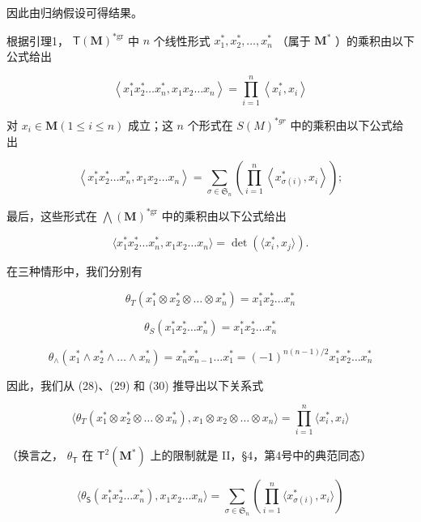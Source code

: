 因此由归纳假设可得结果。

根据引理1， \(\mathsf{T}(\mathbf{M})^{*\mathrm{gr}}\) 中 \(n\) 个线性形式 \(x_{1}^{*}, x_{2}^{*}, \ldots, x_{n}^{*}\) （属于 \(\mathbf{M}^{*}\) ）的乘积由以下公式给出

\[
\left\langle x _ {1} ^ {*} x _ {2} ^ {*} \dots x _ {n} ^ {*}, x _ {1} x _ {2} \dots x _ {n} \right\rangle = \prod_ {i = 1} ^ {n} \left\langle x _ {i} ^ {*}, x _ {i} \right\rangle\tag{28}
\]

对 \(x_{i} \in \mathbf{M} (1 \leqslant i \leqslant n)\) 成立；这 \(n\) 个形式在 \(S(M)^{*gr}\) 中的乘积由以下公式给出

\[
\left\langle x _ {1} ^ {*} x _ {2} ^ {*} \dots x _ {n} ^ {*}, x _ {1} x _ {2} \dots x _ {n} \right\rangle = \sum_ {\sigma \in \mathfrak {S} _ {n}} \left(\prod_ {i = 1} ^ {n} \left\langle x _ {\sigma (i)} ^ {*}, x _ {i} \right\rangle\right);\tag{29}
\]

最后，这些形式在 \(\bigwedge (\mathbf{M})^{*\mathrm{gr}}\) 中的乘积由以下公式给出

\[
\langle x _ {1} ^ {*} x _ {2} ^ {*} \dots x _ {n} ^ {*}, x _ {1} x _ {2} \dots x _ {n} \rangle = \det (\langle x _ {i} ^ {*}, x _ {j} \rangle).\tag{30}
\]

在三种情形中，我们分别有

\[
\theta_ {T} (x _ {1} ^ {*} \otimes x _ {2} ^ {*} \otimes \dots \otimes x _ {n} ^ {*}) = x _ {1} ^ {*} x _ {2} ^ {*} \dots x _ {n} ^ {*}
\]

\[
\theta_ {S} (x _ {1} ^ {*} x _ {2} ^ {*} \dots x _ {n} ^ {*}) = x _ {1} ^ {*} x _ {2} ^ {*} \dots x _ {n} ^ {*}
\]

\[
\theta_ {\wedge} (x _ {1} ^ {*} \wedge x _ {2} ^ {*} \wedge \dots \wedge x _ {n} ^ {*}) = x _ {n} ^ {*} x _ {n - 1} ^ {*} \dots x _ {1} ^ {*} = (- 1) ^ {n (n - 1) / 2} x _ {1} ^ {*} x _ {2} ^ {*} \dots x _ {n} ^ {*}
\]

因此，我们从 (28)、(29) 和 (30) 推导出以下关系式

\[
\langle \theta_ {T} (x _ {1} ^ {*} \otimes x _ {2} ^ {*} \otimes \dots \otimes x _ {n} ^ {*}), x _ {1} \otimes x _ {2} \otimes \dots \otimes x _ {n} \rangle = \prod_ {i = 1} ^ {n} \langle x _ {i} ^ {*}, x _ {i} \rangle\tag{28 bis}
\]

（换言之， \(\theta_{\mathsf{T}}\) 在 \(\mathsf{T}^2 (\mathbf{M}^*)\) 上的限制就是 II，§4，第4号中的典范同态）

\[
\langle \theta_ {\mathsf {S}} (x _ {1} ^ {*} x _ {2} ^ {*} \dots x _ {n} ^ {*}), x _ {1} x _ {2} \dots x _ {n} \rangle = \sum_ {\sigma \in \mathfrak {S} _ {n}} \left(\prod_ {i = 1} ^ {n} \langle x _ {\sigma (i)} ^ {*}, x _ {i} \rangle\right)\tag{29 bis}
\]


